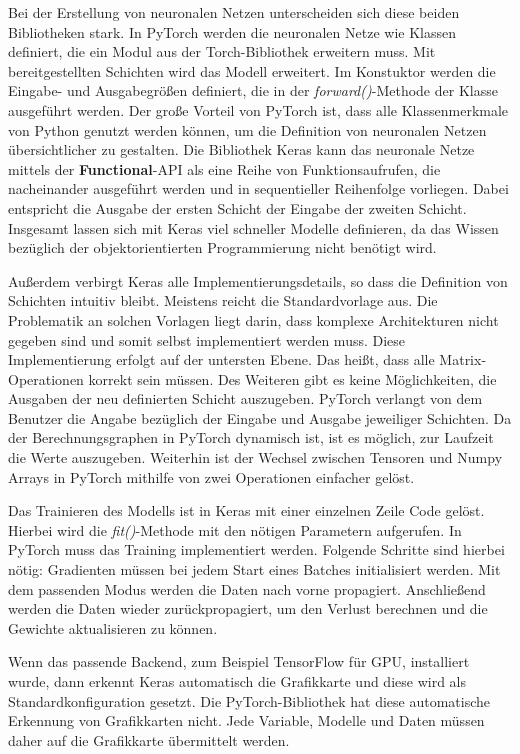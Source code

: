 Bei der Erstellung von neuronalen Netzen unterscheiden sich diese beiden Bibliotheken stark. In PyTorch werden die neuronalen Netze wie Klassen definiert, die ein Modul aus der Torch-Bibliothek erweitern muss. Mit bereitgestellten Schichten wird das Modell erweitert. Im Konstuktor werden die Eingabe- und Ausgabegrößen definiert, die in der \textit{forward()}-Methode der Klasse ausgeführt werden. Der große Vorteil von PyTorch ist, dass alle Klassenmerkmale von Python genutzt werden können, um die Definition von neuronalen Netzen übersichtlicher zu gestalten. Die Bibliothek Keras kann das neuronale Netze mittels der \textbf{Functional}-API als eine Reihe von Funktionsaufrufen, die nacheinander ausgeführt werden und in sequentieller Reihenfolge vorliegen. Dabei entspricht die Ausgabe der ersten Schicht der Eingabe der zweiten Schicht. Insgesamt lassen sich mit Keras viel schneller Modelle definieren, da das Wissen bezüglich der objektorientierten Programmierung nicht benötigt wird. 

Außerdem verbirgt Keras alle Implementierungsdetails, so dass die Definition von Schichten intuitiv bleibt. Meistens reicht die Standardvorlage aus. Die Problematik an solchen Vorlagen liegt darin, dass komplexe Architekturen nicht gegeben sind und somit selbst implementiert werden muss. Diese Implementierung erfolgt auf der untersten Ebene. Das heißt, dass alle Matrix-Operationen korrekt sein müssen. Des Weiteren gibt es keine Möglichkeiten, die Ausgaben der neu definierten Schicht auszugeben. PyTorch verlangt von dem Benutzer die Angabe bezüglich der Eingabe und Ausgabe jeweiliger Schichten. Da der Berechnungsgraphen in PyTorch dynamisch ist, ist es möglich, zur Laufzeit die Werte auszugeben. Weiterhin ist der Wechsel zwischen Tensoren und Numpy Arrays in PyTorch mithilfe von zwei Operationen einfacher gelöst. 

Das Trainieren des Modells ist in Keras mit einer einzelnen Zeile Code gelöst. Hierbei wird die \textit{fit()}-Methode mit den nötigen Parametern aufgerufen. In PyTorch muss das Training implementiert werden. Folgende Schritte sind hierbei nötig: Gradienten müssen bei jedem Start eines Batches initialisiert werden. Mit dem passenden Modus werden die Daten nach vorne propagiert. Anschließend werden die Daten wieder zurückpropagiert, um den Verlust berechnen und die Gewichte aktualisieren zu können. 

Wenn das passende Backend, zum Beispiel TensorFlow für GPU, installiert wurde, dann erkennt Keras automatisch die Grafikkarte und diese wird als Standardkonfiguration gesetzt. Die PyTorch-Bibliothek hat diese automatische Erkennung von Grafikkarten nicht. Jede Variable, Modelle und Daten müssen daher auf die Grafikkarte übermittelt werden. 

